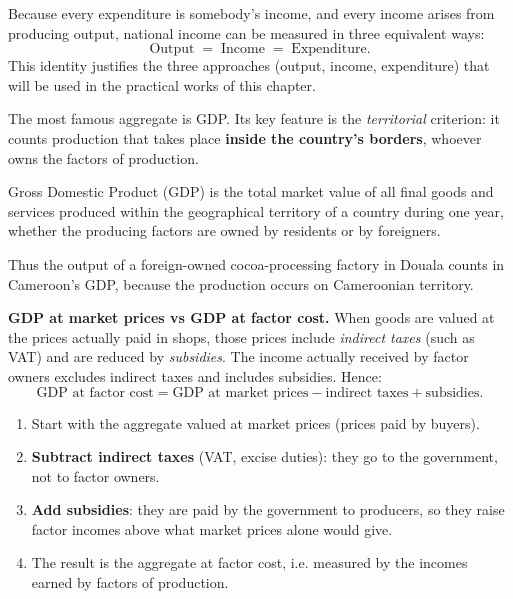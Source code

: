 \documentclass[11pt]{article}
\newcommand{\cle}[1]{{\popxbold\color{popdark}#1}}
\newcounter{popsec}
\newcounter{popsub}
\newcommand{\courssub}[1]{%
  \stepcounter{popsub}%
  \par\vspace{9pt}\noindent{\popxbold\fontsize{11.5}{13}\selectfont\color{popink}{\color{poporange}\thepopsec.\thepopsub}\hspace{6pt}#1}\par\nopagebreak\vspace{4pt}
}
\begin{document}
\begin{aretenir}
Because every expenditure is somebody's income, and every income arises from producing output, national income can be measured in three equivalent ways:
\[ \text{Output} \;=\; \text{Income} \;=\; \text{Expenditure}. \]
This identity justifies the three approaches (output, income, expenditure) that will be used in the practical works of this chapter.
\end{aretenir}

\courssub{Gross Domestic Product (GDP)}

The most famous aggregate is GDP. Its key feature is the \emph{territorial} criterion: it counts production that takes place \textbf{inside the country's borders}, whoever owns the factors of production.

\begin{definition}
\cle{Gross Domestic Product (GDP)} is the total market value of all final goods and services produced within the geographical territory of a country during one year, whether the producing factors are owned by residents or by foreigners.
\end{definition}

Thus the output of a foreign-owned cocoa-processing factory in Douala counts in Cameroon's GDP, because the production occurs on Cameroonian territory.

\textbf{GDP at market prices vs GDP at factor cost.} When goods are valued at the prices actually paid in shops, those prices include \emph{indirect taxes} (such as VAT) and are reduced by \emph{subsidies}. The income actually received by factor owners excludes indirect taxes and includes subsidies. Hence:
\[ \text{GDP at factor cost} = \text{GDP at market prices} - \text{indirect taxes} + \text{subsidies}. \]

\begin{methode}
\begin{enumerate}
\item Start with the aggregate valued at \cle{market prices} (prices paid by buyers).
\item \textbf{Subtract indirect taxes} (VAT, excise duties): they go to the government, not to factor owners.
\item \textbf{Add subsidies}: they are paid by the government to producers, so they raise factor incomes above what market prices alone would give.
\item The result is the aggregate at \cle{factor cost}, i.e. measured by the incomes earned by factors of production.
\end{enumerate}
\end{methode}
\end{document}
